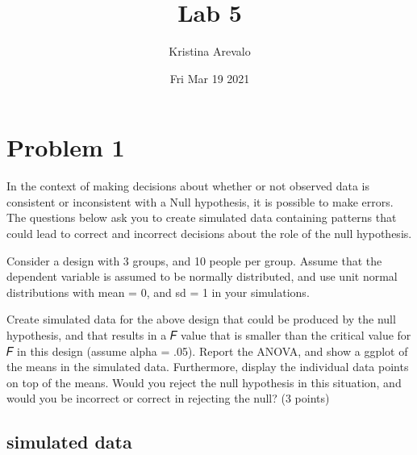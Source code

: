 \documentclass[
]{article}
\title{Lab 5}
\author{Kristina Arevalo}
\date{Fri Mar 19 2021}
\begin{document}
\maketitle

{
\setcounter{tocdepth}{2}
\tableofcontents
}
\newpage

\hypertarget{problem-1}{%
\section{Problem 1}\label{problem-1}}

In the context of making decisions about whether or not observed data is
consistent or inconsistent with a Null hypothesis, it is possible to
make errors. The questions below ask you to create simulated data
containing patterns that could lead to correct and incorrect decisions
about the role of the null hypothesis.

Consider a design with 3 groups, and 10 people per group. Assume that
the dependent variable is assumed to be normally distributed, and use
unit normal distributions with mean = 0, and sd = 1 in your simulations.

Create simulated data for the above design that could be produced by the
null hypothesis, and that results in a 𝐹 value that is smaller than the
critical value for 𝐹 in this design (assume alpha = .05). Report the
ANOVA, and show a ggplot of the means in the simulated data.
Furthermore, display the individual data points on top of the means.
Would you reject the null hypothesis in this situation, and would you be
incorrect or correct in rejecting the null? (3 points)

\hypertarget{simulated-data}{%
\subsection{simulated data}\label{simulated-data}}
\end{document}
